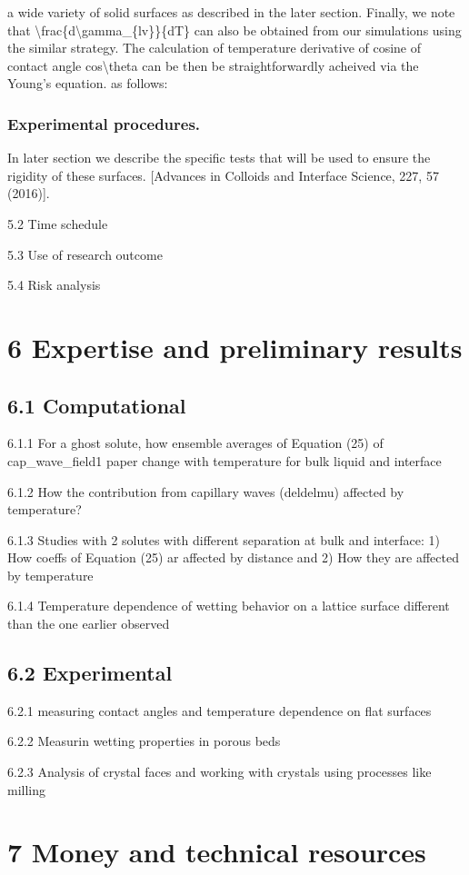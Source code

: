 a wide variety of solid surfaces as described in the later section. Finally, we note that \textbackslash frac\{d\textbackslash gamma\_\{lv\}\}\{dT\} can also be obtained from our simulations using the similar strategy. The calculation of temperature derivative of cosine of contact angle cos\textbackslash theta can be then be straightforwardly acheived via the Young's equation. as follows:\subsubsection{Experimental procedures.}

\par In later section we describe the specific tests that will be used to ensure the rigidity of these surfaces. [Advances in Colloids and Interface Science, 227, 57 (2016)].
\par 5.2 Time schedule
\par 5.3 Use of research outcome
\par 5.4 Risk analysis\section{6 Expertise and preliminary results}
\subsection{6.1 Computational}

\par 6.1.1 For a ghost solute, how ensemble averages of Equation (25) of cap\_wave\_field1 paper change with temperature for bulk liquid and interface
\par 6.1.2 How the contribution from capillary waves (deldelmu) affected by temperature?
\par 6.1.3 Studies with 2 solutes with different separation at bulk and interface: 1) How coeffs of Equation (25) ar affected by distance and 2) How they are affected by temperature
\par 6.1.4 Temperature dependence of wetting behavior on a lattice surface different than the one earlier observed\subsection{6.2 Experimental}

\par 6.2.1 measuring contact angles and temperature dependence on flat surfaces
\par 6.2.2 Measurin wetting properties in porous beds
\par 6.2.3 Analysis of crystal faces and working with crystals using processes like milling\section{7 Money and technical resources}
